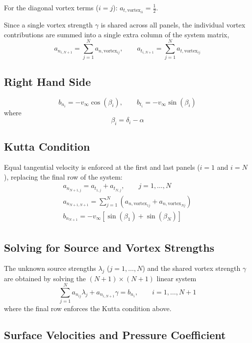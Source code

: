 For the diagonal vortex terms ($i = j$): $a_{t,\text{vortex}_{ii}} = \tfrac{1}{2}$. \newline

Since a single vortex strength $\gamma$ is shared across all panels, the individual vortex contributions are summed
into a single extra column of the system matrix,
\[
    a_{n_{i,N+1}} = \sum_{j=1}^{N} a_{n,\text{vortex}_{ij}}, \qquad
    a_{t_{i,N+1}} = \sum_{j=1}^{N} a_{t,\text{vortex}_{ij}}
\]

\subsection{Right Hand Side}
\label{subsec:right-hand-side}

\[
    b_{n_i} = -v_\infty \cos(\beta_i), \qquad b_{t_i} = -v_\infty \sin(\beta_i)
\]
where
\[
    \beta_i = \delta_i - \alpha
\]

\subsection{Kutta Condition}
\label{subsec:kutta-condition}

Equal tangential velocity is enforced at the first and last panels ($i = 1$ and $i = N$), replacing the final row of
the system:
\begin{gather*}
    a_{n_{N+1,j}} = a_{t_{1,j}} + a_{t_{N,j}}, \qquad j = 1, \dots, N\\
    a_{n_{N+1,N+1}} = \sum_{j=1}^{N} \left(a_{n,\text{vortex}_{1j}} + a_{n,\text{vortex}_{Nj}}\right)\\
    b_{n_{N+1}} = -v_\infty \left[\sin(\beta_1) + \sin(\beta_N)\right]\\
\end{gather*}

\subsection{Solving for Source and Vortex Strengths}
\label{subsec:solving-for-source-and-vortex-strengths}

The unknown source strengths $\lambda_j$ ($j = 1, \dots, N$) and the shared vortex strength $\gamma$ are obtained by
solving the $(N+1) \times (N+1)$ linear system
\[
    \sum_{j=1}^{N} a_{n_{ij}} \lambda_j + a_{n_{i,N+1}} \gamma = b_{n_i}, \qquad i = 1, \dots, N+1
\]
where the final row enforces the Kutta condition above.

\subsection{Surface Velocities and Pressure Coefficient}
\label{subsec:surface-velocities-and-pressure-coefficient}

